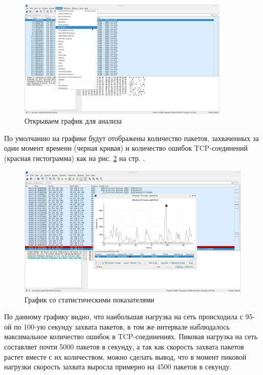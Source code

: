 \documentclass[a4paper]{article}
\begin{document}
  \begin{figure}[H]
    \centering
    \includegraphics[width=0.9\textwidth]{02_0011}
    \caption{Открываем график для анализа}
    \label{img:0011}
  \end{figure}

  По умолчанию на графике будут отображены количество пакетов, захваченных за один момент
  времени (черная кривая) и количество ошибок TCP-соединений (красная гистограмма)
  как на рис. \ref{img:0012} на стр. \pageref{img:0012}.

  \begin{figure}[H]
    \centering
    \includegraphics[width=1.0\textwidth]{02_0012}
    \caption{График со статистическими показателями}
    \label{img:0012}
  \end{figure}

  По данному графику видно, что наибольшая нагрузка на сеть происходила с 95-ой по 
  100-ую секунду захвата пакетов, в том же интервале наблюдалось максимальное количество
  ошибок в TCP-соединениях. Пиковая нагрузка на сеть составляет почти 5000 пакетов в секунду,
  а так как скорость захвата пакетов растет вместе с их количеством, можно сделать вывод,
  что в момент пиковой нагрузки скорость захвата выросла примерно на 4500 пакетов в секунду.
\end{document}
